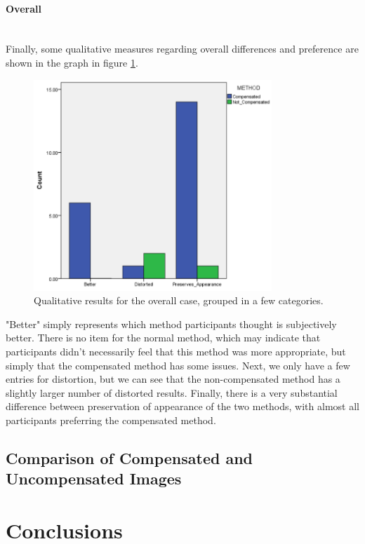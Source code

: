 \documentclass[]{article}
\begin{document}
\paragraph{Overall}\mbox{}\\

Finally, some qualitative measures regarding overall differences and preference are shown in the graph in figure \ref{fig:QualitativeOverall}.


\begin{figure}[!h]
    \centering
    \includegraphics[width=0.80\textwidth]{figures/results/QualitativeOverall.PNG}
    \caption{Qualitative results for the overall case, grouped in a few categories.}
    \label{fig:QualitativeOverall}
\end{figure}

"Better" simply represents which method participants thought is subjectively better. There is no item for the normal method, which may indicate that participants didn't necessarily feel that this method was more appropriate, but simply that the compensated method has some issues. Next, we only have a few entries for distortion, but we can see that the non-compensated method has a slightly larger number of distorted results. Finally, there is a very substantial difference between preservation of appearance of the two methods, with almost all participants preferring the compensated method.

\clearpage
\subsection{Comparison of Compensated and Uncompensated Images}
\clearpage
\section{Conclusions}
\clearpage
\end{document}
